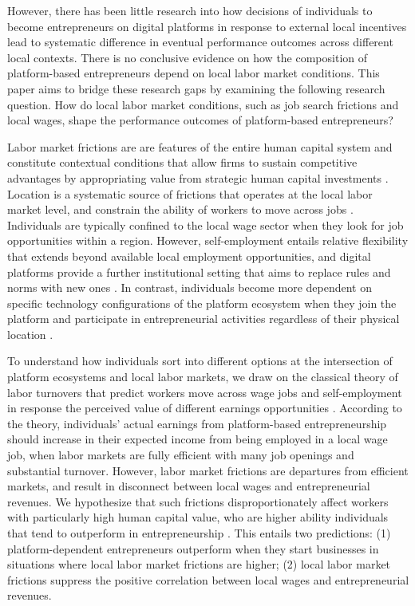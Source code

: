 \documentclass[letterpaper,12pt]{article}
\begin{document}
However, there has been little research into how decisions of individuals to become entrepreneurs on digital platforms in response to external local incentives lead to systematic difference in eventual performance outcomes across different local contexts. There is no conclusive evidence on how the composition of platform-based entrepreneurs depend on local labor market conditions. This paper aims to bridge these research gaps by examining the following research question. How do local labor market conditions, such as job search frictions and local wages, shape the performance outcomes of platform-based entrepreneurs?


Labor market frictions are are features of the entire human capital system and constitute contextual conditions that allow firms to sustain competitive advantages by appropriating value from strategic human capital investments \citep{mahoney_market_2013,campbell_bridging_2017,starr_strategic_2018}. Location is a systematic source of frictions that operates at the local labor market level, and constrain the ability of workers to move across jobs \citep{dahl_home_2012,kim_entrepreneurial_2021}. Individuals are typically confined to the local wage sector when they look for job opportunities within a region. However, self-employment entails relative flexibility that extends beyond available local employment opportunities, and digital platforms provide a further institutional setting that aims to replace rules and norms with new ones \citep{bonina_digital_2021}. In contrast, individuals become more dependent on specific technology configurations of the platform ecosystem when they join the platform and participate in entrepreneurial activities regardless of their physical location \citep{nambisan_digital_2017,autio_digital_2018,cutolo_platform-dependent_2021}.

To understand how individuals sort into different options at the intersection of platform ecosystems and local labor markets, we draw on the classical theory of labor turnovers that predict workers move across wage jobs and self-employment in response the perceived value of different earnings opportunities \citep{jovanovic_job_1979,jovanovic_matching_1984}. According to the theory, individuals’ actual earnings from platform-based entrepreneurship should increase in their expected income from being employed in a local wage job, when labor markets are fully efficient with many job openings and substantial turnover. However, labor market frictions are departures from efficient markets, and result in disconnect between local wages and entrepreneurial revenues. We hypothesize that such frictions disproportionately affect workers with particularly high human capital value, who are higher ability individuals that tend to outperform in entrepreneurship \citep{elfenbein_small_2010,chatterji_learning_2016}. This entails two predictions: (1) platform-dependent entrepreneurs outperform when they start businesses in situations where local labor market frictions are higher; (2) local labor market frictions suppress the positive correlation between local wages and entrepreneurial revenues.
\end{document}
